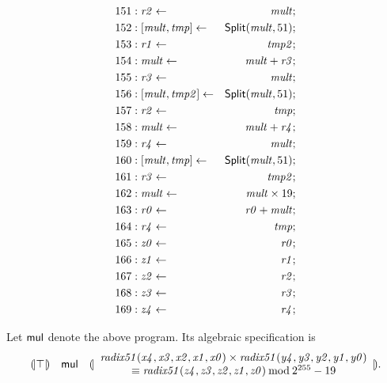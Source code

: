 {\begin{multicols}{2}
\begin{align*}
151 &: \mathit{r2} \leftarrow & \mathit{mult}; \\
152 &: {[}{\mathit{mult}}, {\mathit{tmp}}{]} \leftarrow & \mbox{\textsf{Split}}(\mathit{mult}, 51); \\
153 &: \mathit{r1} \leftarrow & \mathit{tmp2}; \\
154 &: \mathit{mult} \leftarrow & \mathit{mult} + \mathit{r3}; \\
155 &: \mathit{r3} \leftarrow & \mathit{mult}; \\
156 &: {[}{\mathit{mult}}, {\mathit{tmp2}}{]} \leftarrow & \mbox{\textsf{Split}}(\mathit{mult}, 51); \\
157 &: \mathit{r2} \leftarrow & \mathit{tmp}; \\
158 &: \mathit{mult} \leftarrow & \mathit{mult} + \mathit{r4}; \\
159 &: \mathit{r4} \leftarrow & \mathit{mult}; \\
160 &: {[}{\mathit{mult}}, {\mathit{tmp}}{]} \leftarrow & \mbox{\textsf{Split}}(\mathit{mult}, 51); \\
161 &: \mathit{r3} \leftarrow & \mathit{tmp2}; \\
162 &: \mathit{mult} \leftarrow & \mathit{mult} \times 19; \\
163 &: \mathit{r0} \leftarrow & \mathit{r0} + \mathit{mult}; \\
164 &: \mathit{r4} \leftarrow & \mathit{tmp}; \\
165 &: \mathit{z0} \leftarrow & \mathit{r0}; \\
166 &: \mathit{z1} \leftarrow & \mathit{r1}; \\
167 &: \mathit{z2} \leftarrow & \mathit{r2}; \\
168 &: \mathit{z3} \leftarrow & \mathit{r3}; \\
169 &: \mathit{z4} \leftarrow & \mathit{r4}; \\
\end{align*}
\end{multicols}
}

Let $\mbox{\textsf{mul}}$ denote the above program. Its algebraic
specification is 
\[
\begin{array}{rcl}
{(\!|}{\top}{|\!)} &
\mbox{\textsf{mul}} &
{(\!|}{
   \begin{array}{c}
     \mathit{radix51}(\mathit{x4}, \mathit{x3}, \mathit{x2},
     \mathit{x1}, \mathit{x0}) \times
     \mathit{radix51}(\mathit{y4}, \mathit{y3}, \mathit{y2},
     \mathit{y1}, \mathit{y0})\\
     \equiv 
     \mathit{radix51}(\mathit{z4}, \mathit{z3}, \mathit{z2},
     \mathit{z1}, \mathit{z0})
     \mathbin{\textmd{mod}} 2^{255}-19
   \end{array}
}{|\!)}.
\end{array}
\]
